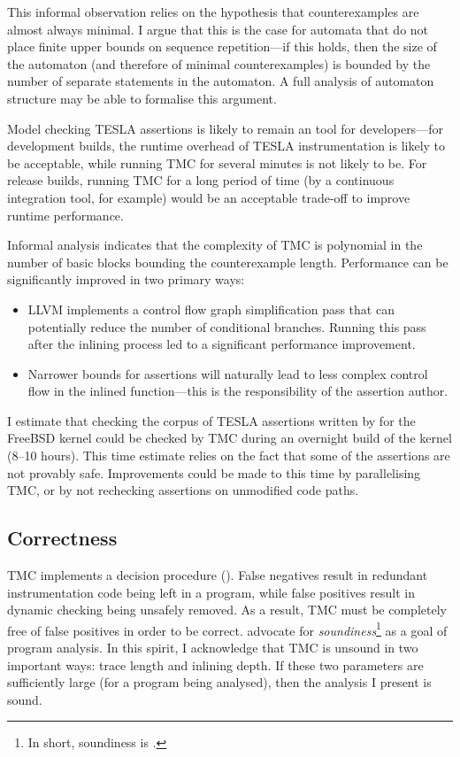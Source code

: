 This informal observation relies on the hypothesis that counterexamples are
almost always minimal. I argue that this is the case for automata that do not
place finite upper bounds on sequence repetition---if this holds, then the size
of the automaton (and therefore of minimal counterexamples) is bounded by the
number of separate statements in the automaton. A full analysis of automaton
structure may be able to formalise this argument.

Model checking TESLA assertions is likely to remain an  tool
for developers---for development builds, the runtime overhead of TESLA
instrumentation is likely to be acceptable, while running TMC for several
minutes is not likely to be. For release builds, running TMC for a long period
of time (by a continuous integration tool, for example) would be an acceptable
trade-off to improve runtime performance.

Informal analysis indicates that the complexity of TMC is polynomial in the
number of basic blocks bounding the counterexample length. Performance can be
significantly improved in two primary ways:
\begin{itemize}
  \item LLVM implements a control flow graph simplification pass that can
    potentially reduce the number of conditional branches. Running this pass
    after the inlining process led to a significant performance improvement.
  \item Narrower bounds for assertions will naturally lead to less complex
    control flow in the inlined function---this is the responsibility of the
    assertion author.
\end{itemize}

I estimate that checking the corpus of TESLA assertions written by
\textcite{anderson_tesla:_2014} for the FreeBSD kernel could be checked by TMC
during an overnight build of the kernel (8--10 hours). This time estimate relies
on the fact that some of the assertions are not provably safe. Improvements
could be made to this time by parallelising TMC, or by not rechecking assertions
on unmodified code paths.

\subsection{Correctness}

TMC implements a decision procedure (). False negatives result in redundant instrumentation code being left
in a program, while false positives result in dynamic checking being unsafely
removed. As a result, TMC must be completely free of false positives in order to
be correct.  \textcite{livshits_defense_2015} advocate for
\emph{soundiness}\footnote{In short, soundiness is .} as a goal of program analysis. In this spirit, I
acknowledge that TMC is unsound in two important ways: trace length and inlining
depth. If these two parameters are sufficiently large (for a program being
analysed), then the analysis I present is sound.

